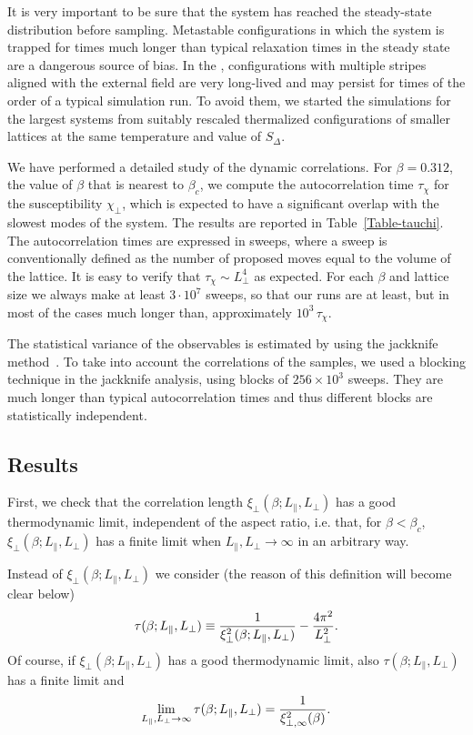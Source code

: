 \documentclass[12pt]{article}
\begin{document}

It is very important to be sure that the system has reached the steady-state
distribution before sampling. 
Metastable configurations in which the system is trapped for times
much longer than typical relaxation times in the steady state are
a dangerous source of bias. In the \dlg ,
configurations with multiple stripes aligned with the external
field are very long-lived and may
persist for times of the order of a typical simulation run.
To avoid them, we started the simulations for  
the largest systems from suitably rescaled thermalized configurations
of smaller lattices at the same temperature and value of $S_\Delta$.  

We have performed a detailed study of the dynamic correlations. 
For $\beta = 0.312$, the value of $\beta$ that is nearest to $\beta_c$, 
we compute the autocorrelation time $\tau_\chi$ for the 
susceptibility $\chi_\bot$, which is expected to have a significant overlap 
with the slowest modes of the system. The results are reported 
in Table~\ref{Table-tauchi}. The autocorrelation times are expressed 
in sweeps, 
where a sweep is conventionally defined as the number of proposed
moves equal to the volume of the lattice. It is easy to verify that 
$\tau_\chi \sim L_\bot^4$ as expected.  For each $\beta$ and lattice size
we always make at least $3\cdot 10^7$ sweeps, so that our runs are at least,
but in most of the cases much longer than, approximately $10^3\, \tau_\chi$. 


The statistical variance of the observables is estimated by using the 
jackknife method~\cite{Efron82}.   
To take into account the  correlations of the samples,
we used a blocking technique in the jackknife analysis, using blocks 
of $256\times 10^3$ sweeps. They are much longer than typical autocorrelation
times and thus different blocks are statistically independent.


\subsection{Results}
\label{sec5:FSS}

First, we check that the correlation length $\xi_\bot(\beta;L_\|,L_\bot)$ 
has a good thermodynamic limit, independent of the aspect ratio,  i.e. 
that, for $\beta<\beta_c$,  $\xi_\bot(\beta;L_\|,L_\bot)$ has a finite limit
when $L_\|,L_\bot\to \infty$ in an arbitrary way. 

Instead of $\xi_\bot(\beta;L_\|,L_\bot)$ we 
 consider (the reason of this definition will become clear
below)
\begin{equation}
  \label{eq:definition_of_tauelle}
  \tau(\beta; L_\|,L_\bot) \equiv 
  {1\over \xi_\bot^2(\beta;L_\|,L_\bot)} - {4 \pi^2 \over L_\bot^2}.
\end{equation}
Of course, if $\xi_\bot(\beta;L_\|,L_\bot)$ has a good thermodynamic limit, 
also $\tau(\beta; L_\|,L_\bot)$
has a finite limit and 
\begin{equation} 
\lim_{L_\|,L_\bot\to\infty} \tau(\beta; L_\|,L_\bot) = 
    {1\over \xi_{\bot,\infty}^2(\beta)}.
\label{limit-tauL}
\end{equation} 
\end{document}
